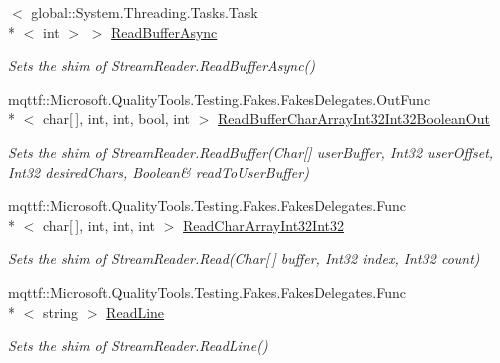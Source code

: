 \begin{DoxyCompactItemize}
$<$ global\-::\-System.\-Threading.\-Tasks.\-Task\\*
$<$ int $>$ $>$ \hyperlink{class_system_1_1_i_o_1_1_fakes_1_1_shim_stream_reader_a09ba94e177c7ec6439fd08599c0c6512}{Read\-Buffer\-Async}
\begin{DoxyCompactList}\small\item\em Sets the shim of Stream\-Reader.\-Read\-Buffer\-Async()\end{DoxyCompactList}\item 
mqttf\-::\-Microsoft.\-Quality\-Tools.\-Testing.\-Fakes.\-Fakes\-Delegates.\-Out\-Func\\*
$<$ char\mbox{[}$\,$\mbox{]}, int, int, bool, int $>$ \hyperlink{class_system_1_1_i_o_1_1_fakes_1_1_shim_stream_reader_aba828155327bcca0c8c5c4eabfdc2818}{Read\-Buffer\-Char\-Array\-Int32\-Int32\-Boolean\-Out}
\begin{DoxyCompactList}\small\item\em Sets the shim of Stream\-Reader.\-Read\-Buffer(Char\mbox{[}\mbox{]} user\-Buffer, Int32 user\-Offset, Int32 desired\-Chars, Boolean\& read\-To\-User\-Buffer)\end{DoxyCompactList}\item 
mqttf\-::\-Microsoft.\-Quality\-Tools.\-Testing.\-Fakes.\-Fakes\-Delegates.\-Func\\*
$<$ char\mbox{[}$\,$\mbox{]}, int, int, int $>$ \hyperlink{class_system_1_1_i_o_1_1_fakes_1_1_shim_stream_reader_a88d1976ef62e57d4b0c66c8ef68a9a6e}{Read\-Char\-Array\-Int32\-Int32}
\begin{DoxyCompactList}\small\item\em Sets the shim of Stream\-Reader.\-Read(\-Char\mbox{[}$\,$\mbox{]} buffer, Int32 index, Int32 count)\end{DoxyCompactList}\item 
mqttf\-::\-Microsoft.\-Quality\-Tools.\-Testing.\-Fakes.\-Fakes\-Delegates.\-Func\\*
$<$ string $>$ \hyperlink{class_system_1_1_i_o_1_1_fakes_1_1_shim_stream_reader_a0817b66b09bcf71f89159762cf9ac9cf}{Read\-Line}
\begin{DoxyCompactList}\small\item\em Sets the shim of Stream\-Reader.\-Read\-Line()\end{DoxyCompactList}\item 

\end{DoxyCompactItemize}

